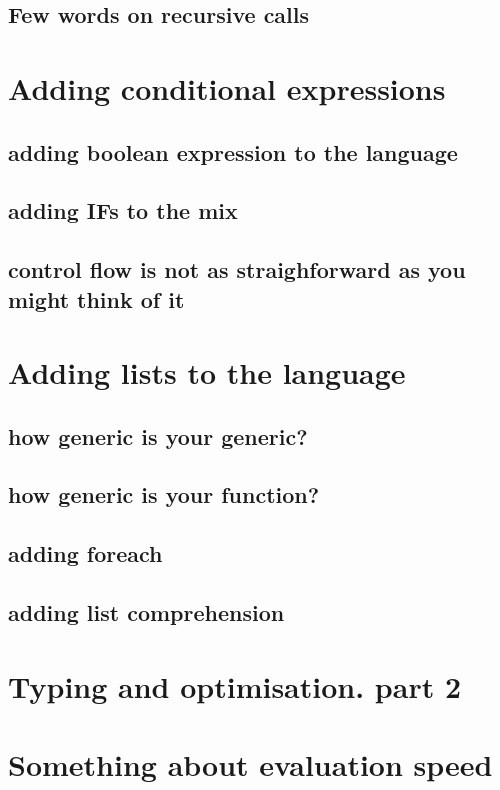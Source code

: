 \documentclass[11pt]{article}
\begin{document}
\subsection{Few words on recursive calls}
\label{sec:org7e34e02}
\section{Adding conditional expressions}
\label{sec:orgaa9098b}
\subsection{adding boolean expression to the language}
\label{sec:org908a687}
\subsection{adding IFs to the mix}
\label{sec:org5e232bd}
\subsection{control flow is not as straighforward as you might think of it}
\label{sec:org1b2f913}
\section{Adding lists to the language}
\label{sec:orgc66e750}
\subsection{how generic is your generic?}
\label{sec:orge4b9b0c}
\subsection{how generic is your function?}
\label{sec:orgec74a62}
\subsection{adding foreach}
\label{sec:org0fa1db1}
\subsection{adding list comprehension}
\label{sec:org901be26}
\section{Typing and optimisation. part 2}
\label{sec:org7867ea8}
\section{Something about evaluation speed}
\label{sec:org357d5d2}
\end{document}

